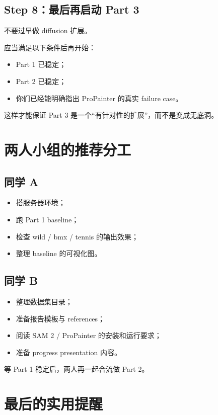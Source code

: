 \documentclass[11pt,a4paper,fontset=none]{ctexart}
\begin{document}
\subsection*{Step 8：最后再启动 Part 3}

不要过早做 diffusion 扩展。

应当满足以下条件后再开始：

\begin{itemize}
  \item Part 1 已稳定；
  \item Part 2 已稳定；
  \item 你们已经能明确指出 ProPainter 的真实 failure case。
\end{itemize}

这样才能保证 Part 3 是一个“有针对性的扩展”，而不是变成无底洞。

\section{两人小组的推荐分工}

\subsection*{同学 A}

\begin{itemize}
  \item 搭服务器环境；
  \item 跑 Part 1 baseline；
  \item 检查 wild / bmx / tennis 的输出效果；
  \item 整理 baseline 的可视化图。
\end{itemize}

\subsection*{同学 B}

\begin{itemize}
  \item 整理数据集目录；
  \item 准备报告模板与 references；
  \item 阅读 SAM 2 / ProPainter 的安装和运行要求；
  \item 准备 progress presentation 内容。
\end{itemize}

等 Part 1 稳定后，两人再一起合流做 Part 2。

\section{最后的实用提醒}
\end{document}
